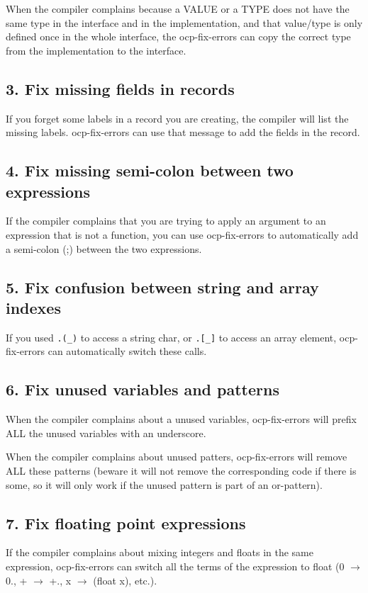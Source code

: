When the compiler complains because a VALUE or a TYPE does not have
the same type in the interface and in the implementation, and that
value/type is only defined once in the whole interface, the
ocp-fix-errors can copy the correct type from the implementation to
the interface.

\subsection{3. Fix missing fields in records}

If you forget some labels in a record you are creating, the compiler
will list the missing labels. ocp-fix-errors can use that message
to add the fields in the record.

\subsection{4. Fix missing semi-colon between two expressions}

If the compiler complains that you are trying to apply an argument
to an expression that is not a function, you can use ocp-fix-errors
to automatically add a semi-colon (;) between the two expressions.

\subsection{5. Fix confusion between string and array indexes}

If you used \verb!.(_)! to access a string char, or \verb!.[_]! to
access an array element, ocp-fix-errors can automatically switch these
calls.

\subsection{6. Fix unused variables and patterns}


When the compiler complains about a unused variables, ocp-fix-errors
will prefix ALL the unused variables with an underscore.

When the compiler complains about unused patters, ocp-fix-errors will
remove ALL these patterns (beware it will not remove the corresponding
code if there is some, so it will only work if the unused pattern is
part of an or-pattern).

\subsection{7. Fix floating point expressions}

If the compiler complains about mixing integers and floats in the same
expression, ocp-fix-errors can switch all the terms of the expression
to float (0 $\rightarrow$ 0., + $\rightarrow$ +., x $\rightarrow$
(float x), etc.).

